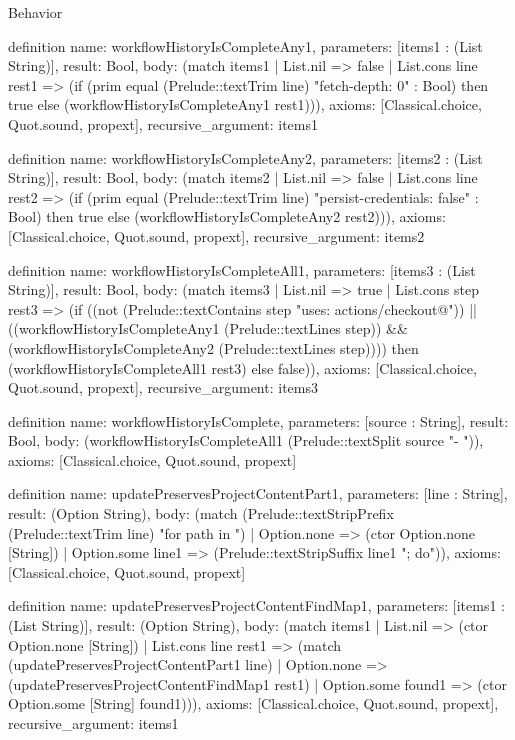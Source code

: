 \begin{lexlean}{Behavior}
\begin{semanticmodule}
definition{
  name: workflowHistoryIsCompleteAny1,
  parameters: [items1 : (List String)],
  result: Bool,
  body: (match items1
    | List.nil => false
    | List.cons line rest1 => (if (prim equal (Prelude::textTrim line) "fetch-depth: 0" : Bool) then true else (workflowHistoryIsCompleteAny1 rest1))),
  axioms: [Classical.choice, Quot.sound, propext],
  recursive_argument: items1
}

definition{
  name: workflowHistoryIsCompleteAny2,
  parameters: [items2 : (List String)],
  result: Bool,
  body: (match items2
    | List.nil => false
    | List.cons line rest2 => (if (prim equal (Prelude::textTrim line) "persist-credentials: false" : Bool) then true else (workflowHistoryIsCompleteAny2 rest2))),
  axioms: [Classical.choice, Quot.sound, propext],
  recursive_argument: items2
}

definition{
  name: workflowHistoryIsCompleteAll1,
  parameters: [items3 : (List String)],
  result: Bool,
  body: (match items3
    | List.nil => true
    | List.cons step rest3 => (if ((not (Prelude::textContains step "uses: actions/checkout@")) || ((workflowHistoryIsCompleteAny1 (Prelude::textLines step)) && (workflowHistoryIsCompleteAny2 (Prelude::textLines step)))) then (workflowHistoryIsCompleteAll1 rest3) else false)),
  axioms: [Classical.choice, Quot.sound, propext],
  recursive_argument: items3
}

definition{
  name: workflowHistoryIsComplete,
  parameters: [source : String],
  result: Bool,
  body: (workflowHistoryIsCompleteAll1 (Prelude::textSplit source "\n      - ")),
  axioms: [Classical.choice, Quot.sound, propext]
}

definition{
  name: updatePreservesProjectContentPart1,
  parameters: [line : String],
  result: (Option String),
  body: (match (Prelude::textStripPrefix (Prelude::textTrim line) "for path in ")
    | Option.none => (ctor Option.none [String])
    | Option.some line1 => (Prelude::textStripSuffix line1 "; do")),
  axioms: [Classical.choice, Quot.sound, propext]
}

definition{
  name: updatePreservesProjectContentFindMap1,
  parameters: [items1 : (List String)],
  result: (Option String),
  body: (match items1
    | List.nil => (ctor Option.none [String])
    | List.cons line rest1 => (match (updatePreservesProjectContentPart1 line)
      | Option.none => (updatePreservesProjectContentFindMap1 rest1)
      | Option.some found1 => (ctor Option.some [String] found1))),
  axioms: [Classical.choice, Quot.sound, propext],
  recursive_argument: items1
}


\end{semanticmodule}
\end{lexlean}
